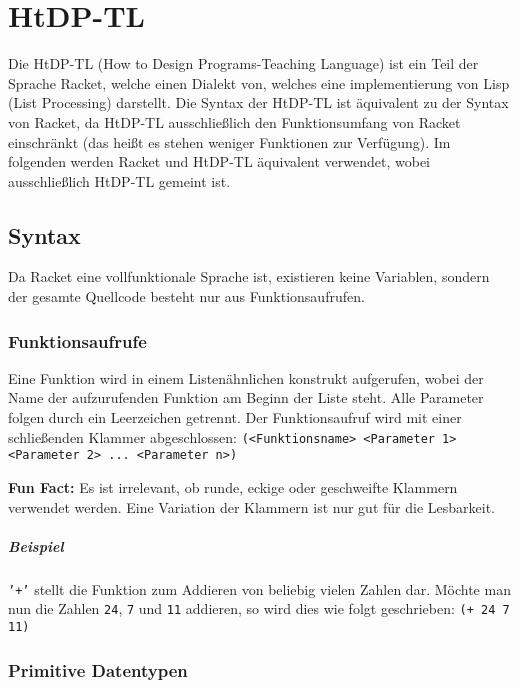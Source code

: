 


\chapter{HtDP-TL}
Die HtDP-TL (How to Design Programs-Teaching Language) ist ein Teil der Sprache Racket, welche einen Dialekt von, welches eine implementierung von Lisp (List Processing) darstellt. Die Syntax der HtDP-TL ist äquivalent zu der Syntax von Racket, da HtDP-TL ausschließlich den Funktionsumfang von Racket einschränkt (das heißt es stehen weniger Funktionen zur Verfügung). Im folgenden werden Racket und HtDP-TL äquivalent verwendet, wobei ausschließlich HtDP-TL gemeint ist.

\section{Syntax}
Da Racket eine vollfunktionale Sprache ist, existieren keine Variablen, sondern der gesamte Quellcode besteht nur aus Funktionsaufrufen.

\subsection{Funktionsaufrufe}
Eine Funktion wird in einem Listenähnlichen konstrukt aufgerufen, wobei der Name der aufzurufenden Funktion am Beginn der Liste steht. Alle Parameter folgen durch ein Leerzeichen getrennt. Der Funktionsaufruf wird mit einer schließenden Klammer abgeschlossen: \texttt{(<Funktionsname> <Parameter 1> <Parameter 2> ... <Parameter n>)}

\textbf{Fun Fact:} Es ist irrelevant, ob runde, eckige oder geschweifte Klammern verwendet werden. Eine Variation der Klammern ist nur gut für die Lesbarkeit.

\paragraph{Beispiel}
\texttt{'+'} stellt die Funktion zum Addieren von beliebig vielen Zahlen dar. Möchte man nun die Zahlen \texttt{24}, \texttt{7} und \texttt{11} addieren, so wird dies wie folgt geschrieben: \texttt{(+ 24 7 11)}



\subsection{Primitive Datentypen}
